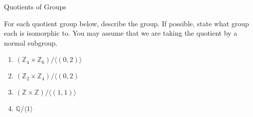 \begin{section}{Quotients of Groups}
\begin{problem}
For each quotient group below, describe the group.  If possible, state what group each is isomorphic to.  You may assume that we are taking the quotient by a normal subgroup. 
\begin{enumerate}[label=\textrm{(\alph*)}]
\item $(\mathbb{Z}_4\times \mathbb{Z}_6)/\langle (0,2)\rangle$
\item $(\mathbb{Z}_2\times \mathbb{Z}_4)/\langle (0,2)$
\item $(\mathbb{Z}\times \mathbb{Z})/\langle (1,1)\rangle$
\item $\mathbb{Q}/\langle 1\rangle$ %
\end{enumerate}
\end{problem}

\end{section}